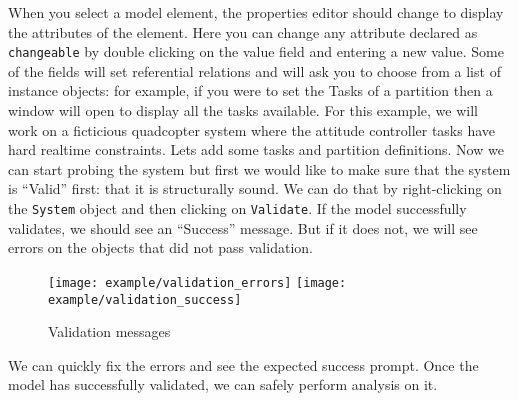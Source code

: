When you select a model element, the properties editor should change to display
the attributes of the element. Here you can change any attribute declared
as \texttt{changeable} by double clicking on the value field and
entering a new value.
Some of the fields will set referential relations and will ask
you to choose from a list of instance objects: for example, if you
were to set the Tasks of a partition then a window will open to display
all the tasks available. For this example, we will work on a ficticious quadcopter system where
the attitude controller tasks have hard realtime constraints.
Lets add some tasks and partition definitions. 
Now we can start probing the system but first we would like to make sure that
the system is ``Valid'' first: that it is structurally sound. We can
do that by right-clicking on the \texttt{System} object and 
then clicking on \texttt{Validate}.
If the model successfully validates, we should see an ``Success''
message. But if it does not, we will see errors on the objects
that did not pass validation.
\begin{figure}
    \texttt{[image: example/validation\_errors]}
    \texttt{[image: example/validation\_success]}
    \caption{Validation messages}
\end{figure}
We can quickly fix the errors and see the expected success prompt.
Once the model has successfully validated, we can safely perform
analysis on it.
